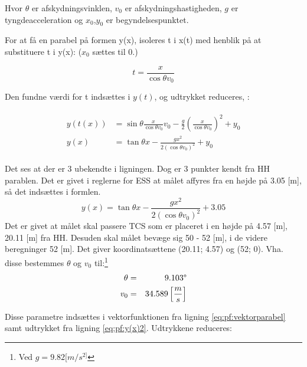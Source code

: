 Hvor $\theta$ er afskydningsvinklen, $v_0$ er afskydningshastigheden, $g$ er tyngdeacceleration og $x_0$,$y_0$ er begyndelsespunktet. 

For at få en parabel på formen y(x), isoleres t i x(t) med henblik på at substituere t i y(x): ($x_0$ sættes til 0.)

\begin{equation}
t = \frac{x}{\cos \theta v_0}
\label{eq:pf:x(t)}
\end{equation}

Den fundne værdi for t indsættes i $y(t)$, og udtrykket reduceres, \citep[Side. 67]{fund_of_physics}: 

\begin{align}
\begin{split}
y(t(x)) &= \sin \theta \frac{x}{\cos \theta v_0} v_0 - \frac{g}{2} \left(\frac{x}{\cos \theta v_0}\right)^2 + y_0 \\
y(x) &= \tan \theta x - \frac{gx^2}{2(\cos \theta v_0)^2} + y_0
\label{eq:pf:y(x(t))}
\end{split}
\end{align}

Det ses at der er 3 ubekendte i ligningen. Dog er 3 punkter kendt fra HH parablen. Det er givet i reglerne for ESS at målet affyres fra en højde på 3.05 [m], så det indsættes i formlen. 
\begin{equation}
y(x) = \tan \theta x - \frac{gx^2}{2(\cos \theta v_0)^2} + 3.05
\label{eq:pf:y(x)2}
\end{equation}
Det er givet at målet skal passere TCS som er placeret i en højde på 4.57 [m], 20.11 [m] fra HH. 
Desuden skal målet bevæge sig 50 - 52 [m], i de videre beregninger 52 [m]. Det giver koordinatsættene (20.11; 4.57) og (52; 0). Vha. disse bestemmes $\theta$ og $v_0$ til:\footnote{Ved $g = 9.82[m/{s}^{2]}$}
\begin{eqnarray}
\theta &=& 9.103 \degree \\
v_0 &=& 34.589 \left[ \frac { m }{ s }  \right] 
\end{eqnarray}

Disse parametre indsættes i vektorfunktionen fra ligning \ref{eq:pf:vektorparabel} samt udtrykket fra ligning \ref{eq:pf:y(x)2}. Udtrykkene reduceres: 

